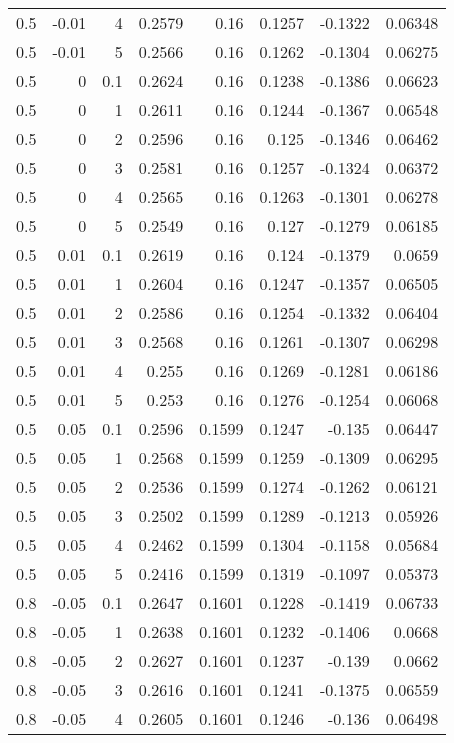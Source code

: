 \documentclass{amsart}
\theoremstyle{plain}
\numberwithin{equation}{section}
\begin{document}
\begin{longtable}{r | r | r | r | r | r | r | r}
0.5 & -0.01 & 4 & 0.2579 & 0.16 & 0.1257 & -0.1322 & 0.06348 \\
0.5 & -0.01 & 5 & 0.2566 & 0.16 & 0.1262 & -0.1304 & 0.06275 \\ \hline
0.5 & 0 & 0.1 & 0.2624 & 0.16 & 0.1238 & -0.1386 & 0.06623 \\
0.5 & 0 & 1 & 0.2611 & 0.16 & 0.1244 & -0.1367 & 0.06548 \\
0.5 & 0 & 2 & 0.2596 & 0.16 & 0.125 & -0.1346 & 0.06462 \\
0.5 & 0 & 3 & 0.2581 & 0.16 & 0.1257 & -0.1324 & 0.06372 \\
0.5 & 0 & 4 & 0.2565 & 0.16 & 0.1263 & -0.1301 & 0.06278 \\
0.5 & 0 & 5 & 0.2549 & 0.16 & 0.127 & -0.1279 & 0.06185 \\ \hline
0.5 & 0.01 & 0.1 & 0.2619 & 0.16 & 0.124 & -0.1379 & 0.0659 \\
0.5 & 0.01 & 1 & 0.2604 & 0.16 & 0.1247 & -0.1357 & 0.06505 \\
0.5 & 0.01 & 2 & 0.2586 & 0.16 & 0.1254 & -0.1332 & 0.06404 \\
0.5 & 0.01 & 3 & 0.2568 & 0.16 & 0.1261 & -0.1307 & 0.06298 \\
0.5 & 0.01 & 4 & 0.255 & 0.16 & 0.1269 & -0.1281 & 0.06186 \\
0.5 & 0.01 & 5 & 0.253 & 0.16 & 0.1276 & -0.1254 & 0.06068 \\ \hline
0.5 & 0.05 & 0.1 & 0.2596 & 0.1599 & 0.1247 & -0.135 & 0.06447 \\
0.5 & 0.05 & 1 & 0.2568 & 0.1599 & 0.1259 & -0.1309 & 0.06295 \\
0.5 & 0.05 & 2 & 0.2536 & 0.1599 & 0.1274 & -0.1262 & 0.06121 \\
0.5 & 0.05 & 3 & 0.2502 & 0.1599 & 0.1289 & -0.1213 & 0.05926 \\
0.5 & 0.05 & 4 & 0.2462 & 0.1599 & 0.1304 & -0.1158 & 0.05684 \\
0.5 & 0.05 & 5 & 0.2416 & 0.1599 & 0.1319 & -0.1097 & 0.05373 \\ \hline
0.8 & -0.05 & 0.1 & 0.2647 & 0.1601 & 0.1228 & -0.1419 & 0.06733 \\
0.8 & -0.05 & 1 & 0.2638 & 0.1601 & 0.1232 & -0.1406 & 0.0668 \\
0.8 & -0.05 & 2 & 0.2627 & 0.1601 & 0.1237 & -0.139 & 0.0662 \\
0.8 & -0.05 & 3 & 0.2616 & 0.1601 & 0.1241 & -0.1375 & 0.06559 \\
0.8 & -0.05 & 4 & 0.2605 & 0.1601 & 0.1246 & -0.136 & 0.06498 \\

\end{longtable}
\end{document}
